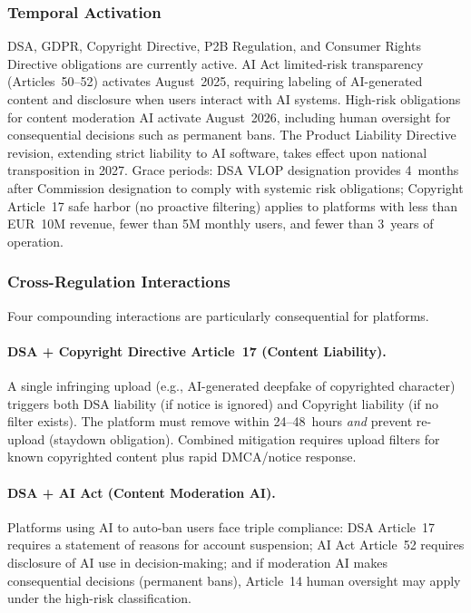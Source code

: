 \documentclass[11pt,a4paper]{article}
\begin{document}
\subsubsection{Temporal Activation}

DSA, GDPR, Copyright Directive, P2B Regulation, and Consumer Rights Directive obligations are currently active. AI Act limited-risk transparency (Articles~50--52) activates August~2025, requiring labeling of AI-generated content and disclosure when users interact with AI systems. High-risk obligations for content moderation AI activate August~2026, including human oversight for consequential decisions such as permanent bans. The Product Liability Directive revision, extending strict liability to AI software, takes effect upon national transposition in 2027. Grace periods: DSA VLOP designation provides 4~months after Commission designation to comply with systemic risk obligations; Copyright Article~17 safe harbor (no proactive filtering) applies to platforms with less than EUR~10M revenue, fewer than 5M monthly users, and fewer than 3~years of operation.

\subsubsection{Cross-Regulation Interactions}

Four compounding interactions are particularly consequential for platforms.

\paragraph{DSA + Copyright Directive Article~17 (Content Liability).} A single infringing upload (e.g., AI-generated deepfake of copyrighted character) triggers both DSA liability (if notice is ignored) and Copyright liability (if no filter exists). The platform must remove within 24--48~hours \emph{and} prevent re-upload (staydown obligation). Combined mitigation requires upload filters for known copyrighted content plus rapid DMCA/notice response.

\paragraph{DSA + AI Act (Content Moderation AI).} Platforms using AI to auto-ban users face triple compliance: DSA Article~17 requires a statement of reasons for account suspension; AI Act Article~52 requires disclosure of AI use in decision-making; and if moderation AI makes consequential decisions (permanent bans), Article~14 human oversight may apply under the high-risk classification.
\end{document}
